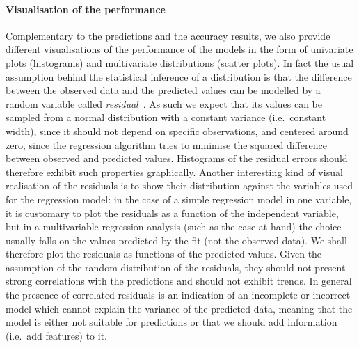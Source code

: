 \paragraph{Visualisation of the performance}

Complementary to the predictions and the accuracy results, we also provide different visualisations of the performance of the models in the form of univariate plots (histograms) and multivariate distributions (scatter plots).
In fact the usual assumption behind the statistical inference of a distribution is that the difference between the observed data and the predicted values can be modelled by a random variable called \textit{residual}~\cite{Skiena:2017:DataScienceDesign,Caffo::DataScienceSpecialization}.\footnotemark{}
As such we expect that its values can be sampled from a normal distribution with a constant variance (i.e.\ constant width), since it should not depend on specific observations, and centered around zero, since the regression algorithm tries to minimise the squared difference between observed and predicted values.
Histograms of the residual errors should therefore exhibit such properties graphically.
Another interesting kind of visual realisation of the residuals is to show their distribution against the variables used for the regression model: in the case of a simple regression model in one variable, it is customary to plot the residuals as a function of the independent variable, but in a multivariable regression analysis (such as the case at hand) the choice usually falls on the values predicted by the fit (not the observed data).
We shall therefore plot the residuals as functions of the predicted values.\footnotemark{}
Given the assumption of the random distribution of the residuals, they should not present strong correlations with the predictions and should not exhibit trends.
In general the presence of correlated residuals is an indication of an incomplete or incorrect model which cannot explain the variance of the predicted data, meaning that the model is either not suitable for predictions or that we should add information (i.e.\ add features) to it.


